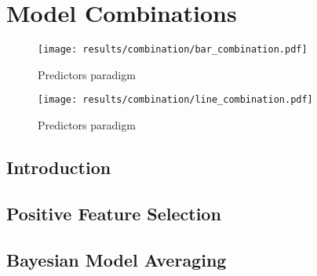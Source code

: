 
\chapter{Model Combinations}
\label{cha:bma}

\begin{figure}[h]
	\begin{center}
		\texttt{[image: results/combination/bar\_combination.pdf]}
		\caption{Predictors paradigm}
	\end{center}
\end{figure}

\begin{figure}[h]
	\begin{center}
		\texttt{[image: results/combination/line\_combination.pdf]}
		\caption{Predictors paradigm}
	\end{center}
\end{figure}

\section{Introduction}
\label{sec:into}

\section{Positive Feature Selection}
\label{sec:notation}

\section{Bayesian Model Averaging}
\label{sec:bma}

